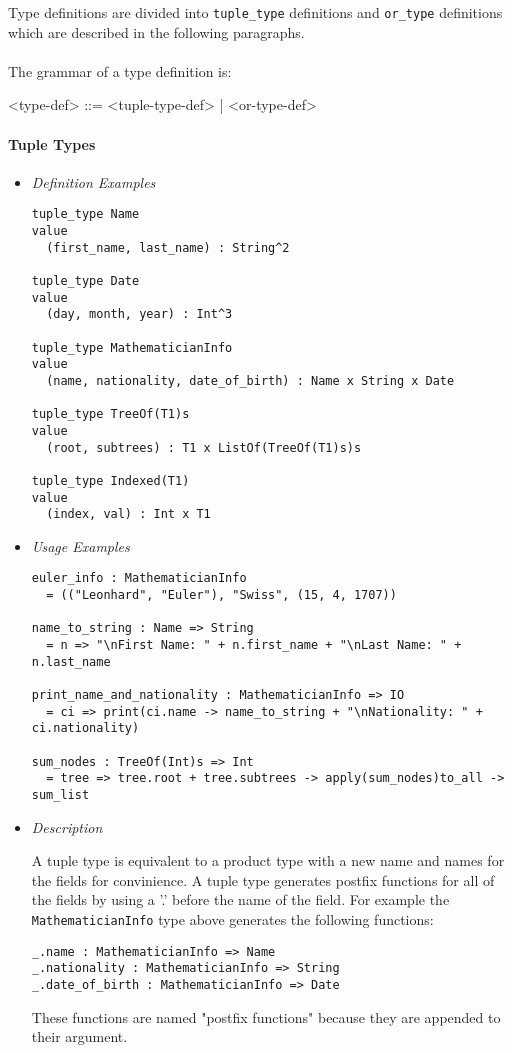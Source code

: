 \documentclass{article}
\begin{document}
Type definitions are divided into \texttt{tuple_type} definitions and
\texttt{or_type} definitions which are described in the following paragraphs.
\\\\
The grammar of a type definition is:
\begin{grammar}
<type-def> ::= <tuple-type-def> | <or-type-def>
\end{grammar}

\paragraph{Tuple Types}

\begin{itemize}
\item \textit{Definition Examples}

\begin{verbatim}
tuple_type Name
value
  (first_name, last_name) : String^2

tuple_type Date
value
  (day, month, year) : Int^3

tuple_type MathematicianInfo
value
  (name, nationality, date_of_birth) : Name x String x Date

tuple_type TreeOf(T1)s
value
  (root, subtrees) : T1 x ListOf(TreeOf(T1)s)s

tuple_type Indexed(T1)
value
  (index, val) : Int x T1
\end{verbatim}

\item \textit{Usage Examples}

\begin{verbatim}
euler_info : MathematicianInfo
  = (("Leonhard", "Euler"), "Swiss", (15, 4, 1707))

name_to_string : Name => String
  = n => "\nFirst Name: " + n.first_name + "\nLast Name: " + n.last_name

print_name_and_nationality : MathematicianInfo => IO
  = ci => print(ci.name -> name_to_string + "\nNationality: " + ci.nationality)

sum_nodes : TreeOf(Int)s => Int
  = tree => tree.root + tree.subtrees -> apply(sum_nodes)to_all -> sum_list
\end{verbatim}

\item \textit{Description}

A tuple type is equivalent to a product type with a new name  and names for the
fields for convinience. A tuple type generates postfix functions for all of
the fields by using a '.' before the name of the field. For example the
\texttt{MathematicianInfo} type above generates the following functions:
\begin{verbatim}
_.name : MathematicianInfo => Name
_.nationality : MathematicianInfo => String
_.date_of_birth : MathematicianInfo => Date
\end{verbatim}
These functions are named "postfix functions" because they are appended to
their argument.


\end{itemize}
\end{document}
